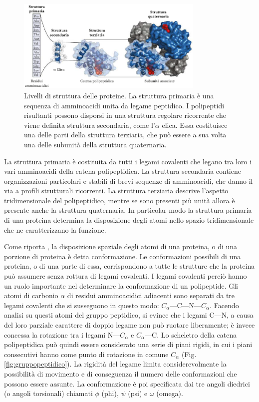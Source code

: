 \begin{figure}
	\centering
	\includegraphics[width=0.8\textwidth]{Immagini/StrutturaGerarchica.png}
	\caption{Livelli di struttura delle proteine. La struttura primaria è una sequenza di amminoacidi unita da legame peptidico. I polipeptidi risultanti possono disporsi in una struttura regolare ricorrente che viene definita struttura secondaria, come l'$\alpha$ elica. Essa costituisce una delle parti della struttura terziaria, che può essere a sua volta una delle subunità della struttura quaternaria.}
	\label{fig:strutturagerarchica}
\end{figure}

La struttura primaria è costituita da tutti i legami covalenti che legano tra loro i vari amminoacidi della catena polipeptidica. La struttura secondaria contiene organizzazioni particolari e stabili di brevi sequenze di amminoacidi, che danno il via a profili strutturali ricorrenti. La struttura terziaria descrive l'aspetto tridimensionale del polipeptidico, mentre se sono presenti più unità allora è presente anche la struttura quaternaria. In particolar modo la struttura primaria di una proteina determina la disposizione degli atomi nello spazio tridimensionale che ne caratterizzano la funzione. 

Come riporta \cite{Principi}, la disposizione spaziale degli atomi di una proteina, o di una porzione di proteina è detta conformazione. Le conformazioni possibili di una proteina, o di una parte di essa, corrispondono a tutte le strutture che la proteina può assumere senza rottura di legami covalenti. 
I legami covalenti perciò hanno un ruolo importante nel determinare la conformazione di un polipeptide. Gli atomi di carbonio $\alpha$ di residui amminoacidici adiacenti sono separati da tre legami covalenti che si susseguono in questo modo: $C_\alpha$---C---N---$C_\alpha$. Facendo analisi su questi atomi del gruppo peptidico, si evince che i legami C---N, a causa del loro parziale carattere di doppio legame non può ruotare liberamente; è invece concessa la rotazione tra i legami N---$C_\alpha$ e $C_\alpha$---C. Lo scheletro della catena polipeptidica può quindi essere considerato una serie di piani rigidi, in cui i piani consecutivi hanno come punto di rotazione in comune $C_\alpha$ (Fig. \ref{fig:gruppopeptidico}). La rigidità del legame limita considerevolmente la possibilità di movimento e di conseguenza il numero delle conformazioni che possono essere assunte. La conformazione è poi specificata dai tre angoli diedrici (o angoli torsionali) chiamati $\phi$ (phi), $\psi$ (psi) e $\omega$ (omega). 

